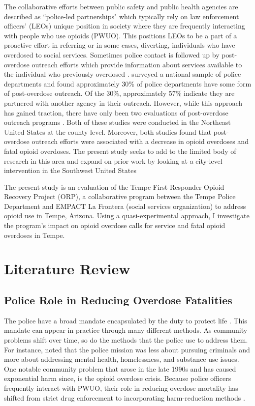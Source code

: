 The collaborative efforts between public safety and public health agencies are described as ``police-led partnerships" which typically rely on law enforcement officers' (LEOs) unique position in society where they are frequently interacting with people who use opioids (PWUO). This positions LEOs to be a part of a proactive effort in referring or in some cases, diverting, individuals who have overdosed to social services. Sometimes police contact is followed up by post-overdose outreach efforts which provide information about services available to the individual who previously overdosed \parencite{formica_characteristics_2021}. \textcite{ray_national_2023} surveyed a national sample of police departments and found approximately 30\% of police departments have some form of post-overdose outreach. Of the 30\%, approximately 57\% indicate they are partnered with another agency in their outreach. However, while this approach has gained traction, there have only been two evaluations of post-overdose outreach programs \parencite{donnelly_law_2022, xuan_association_2023}. Both of these studies were conducted in the Northeast United States at the county level. Moreover, both studies found that post-overdose outreach efforts were associated with a decrease in opioid overdoses and fatal opioid overdoses. The present study seeks to add to the limited body of research in this area and expand on prior work by looking at a city-level intervention in the Southwest United States

The present study is an evaluation of the Tempe-First Responder Opioid Recovery Project (ORP), a collaborative program between the Tempe Police Department and EMPACT La Frontera (social services organization) to address opioid use in Tempe, Arizona. Using a quasi-experimental approach, I investigate the program's impact on opioid overdose calls for service and fatal opioid overdoses in Tempe. 

\section{\centering Literature Review}
\subsection{Police Role in Reducing Overdose Fatalities}

The police have a broad mandate encapsulated by the duty to protect life \parencite{skolnick_above_1993}. This mandate can appear in practice through many different methods. As community problems shift over time, so do the methods that the police use to address them. For instance, \textcite{bittner_florence_1974} noted that the police mission was less about pursuing criminals and more about addressing mental health, homelessness, and substance use issues. One notable community problem that arose in the late 1990s and has caused exponential harm since, is the opioid overdose crisis. Because police officers frequently interact with PWUO, their role in reducing overdose mortality has shifted from strict drug enforcement to incorporating harm-reduction methods \parencite{beckett_uses_2016}.

